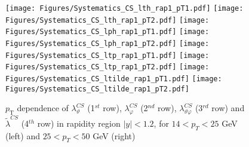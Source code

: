 \documentclass[12pt]{article}
\newcommand{\pT}{p_\mathrm{T}}
\newcommand{\absy}{\left |  y \right |}
\newcommand{\lamthCS}{\lambda^{\scriptscriptstyle CS}_\vartheta}
\newcommand{\lamphCS}{\lambda^{\scriptscriptstyle CS}_\varphi}
\newcommand{\lamthphCS}{\lambda^{\scriptscriptstyle CS}_{\vartheta \varphi}}
\newcommand{\lamtildeCS}{\tilde{\lambda}^{\scriptscriptstyle CS}}
\begin{document}
\begin{figure}[htbp]
\centering
\texttt{[image: Figures/Systematics\_CS\_lth\_rap1\_pT1.pdf]}
\texttt{[image: Figures/Systematics\_CS\_lth\_rap1\_pT2.pdf]}
\texttt{[image: Figures/Systematics\_CS\_lph\_rap1\_pT1.pdf]}
\texttt{[image: Figures/Systematics\_CS\_lph\_rap1\_pT2.pdf]}
\texttt{[image: Figures/Systematics\_CS\_ltp\_rap1\_pT1.pdf]}
\texttt{[image: Figures/Systematics\_CS\_ltp\_rap1\_pT2.pdf]}
\texttt{[image: Figures/Systematics\_CS\_ltilde\_rap1\_pT1.pdf]}
\texttt{[image: Figures/Systematics\_CS\_ltilde\_rap1\_pT2.pdf]}
\caption{$\pT$ dependence of $\lamthCS$
(1$^{st}$ row), $\lamphCS$ (2$^{nd}$ row), $\lamthphCS$ (3$^{rd}$ row) and 
$\lamtildeCS$ (4$^{th}$ row) in rapidity region $\absy<1.2$, for $14 < p_T < 25$ GeV (left) and
$25 < p_T < 50$ GeV (right)}
\end{figure}
\clearpage
\end{document}
